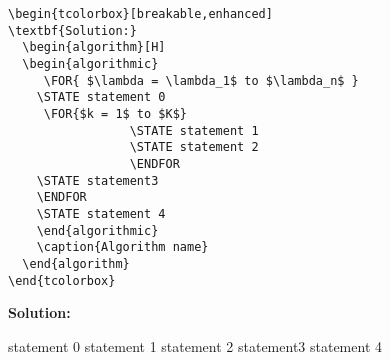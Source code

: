 \documentclass[twoside,12pt]{article}
\begin{document}
\begin{itemize}
\begin{lstlisting}
\begin{tcolorbox}[breakable,enhanced]
\textbf{Solution:}
  \begin{algorithm}[H]
  \begin{algorithmic}
     \FOR{ $\lambda = \lambda_1$ to $\lambda_n$ }
    \STATE statement 0
     \FOR{$k = 1$ to $K$}
                 \STATE statement 1
                 \STATE statement 2                
                 \ENDFOR
    \STATE statement3  
    \ENDFOR
    \STATE statement 4
    \end{algorithmic}
    \caption{Algorithm name}
  \end{algorithm}
\end{tcolorbox}
\end{lstlisting}

\begin{tcolorbox}
\textbf{Solution:}
  \begin{algorithm}[H]
  \begin{algorithmic}
    \STATE statement 0
                 \STATE statement 1
                 \STATE statement 2                
                 \ENDFOR
    \STATE statement3  
    \ENDFOR
    \STATE statement 4
    \end{algorithmic}
    \caption{Algorithm name}
  \end{algorithm}
\end{tcolorbox}
\end{itemize}
\end{document}

